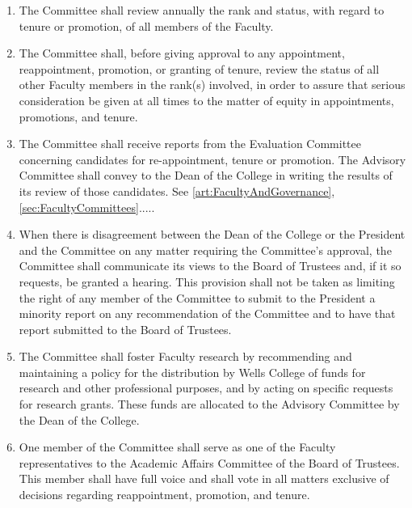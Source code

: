 \documentclass{manual}
\newcommand{\itemLevelA}{\alph*.}
\newcommand{\itemLevelB}{\arabic*)}
\newcommand{\itemRefA}{\alph*}
\newcommand{\itemRefB}{\arabic*}
\begin{document}
\begin{enumerate}[label=\itemLevelA,ref=\itemRefA]
\begin{enumerate}[label=\itemLevelB,ref=\itemRefB]
\item The Committee shall review annually the rank and status, with regard to tenure or promotion, of all members of the Faculty.
\item The Committee shall, before giving approval to any appointment, reappointment, promotion, or granting of tenure, review the status of all other Faculty members in the rank(s) involved, in order to assure that serious consideration be given at all times to the matter of equity in appointments, promotions, and tenure.
\item The Committee shall receive reports from the Evaluation Committee concerning candidates for re-appointment, tenure or promotion. The Advisory Committee shall convey to the Dean of the College in writing the results of its review of those candidates. See \cref{art:FacultyAndGovernance}, \cref{sec:FacultyCommittees}.....
\item When there is disagreement between the Dean of the College or the President and the Committee on any matter requiring the Committee's approval, the Committee shall communicate its views to the Board of Trustees and, if it so requests, be granted a hearing. This provision shall not be taken as limiting the right of any member of the Committee to submit to the President a minority report on any recommendation of the Committee and to have that report submitted to the Board of Trustees.
\item The Committee shall foster Faculty research by recommending and maintaining a policy for the distribution by Wells College of funds for research and other professional purposes, and by acting on specific requests for research grants. These funds are allocated to the Advisory Committee by the Dean of the College.
\item One member of the Committee shall serve as one of the Faculty representatives to the Academic Affairs Committee of the Board of Trustees. This member shall have full voice and shall vote in all matters exclusive of decisions regarding reappointment, promotion, and tenure.


\end{enumerate}
\end{enumerate}
\end{document}
